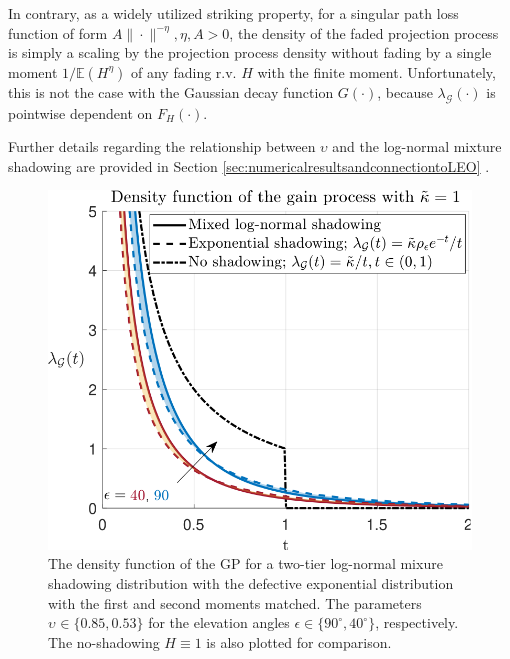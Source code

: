 \documentclass[lettersize,journal]{IEEEtran}
\begin{document}
In contrary, as a widely utilized striking property, for a singular path loss function of form $A\|\cdot\|^{-\eta}, \eta,A>0$, the density of the faded projection process is simply a scaling by the projection process density without fading by a single moment $1/\mathbb{E}(H^{\eta})$ of any fading r.v. $H$ with the finite moment. Unfortunately, this is not the case with the Gaussian decay function $G(\cdot)$, because $\lambda_{\mathcal{G}}(\cdot)$ is pointwise dependent on $F_{H}(\cdot)$.

 Further details regarding the relationship between $\upsilon$ and the log-normal mixture shadowing are provided in Section \ref{sec:numericalresultsandconnectiontoLEO} . 
         \begin{figure}[h]
           \centering
           \includegraphics[width=\linewidth]{plotdensities.pdf}
           \caption{The density function of the GP for a two-tier log-normal mixure shadowing distribution with the defective exponential distribution with the first and second moments matched. The parameters $\upsilon_{} \in \{0.85,0.53\}$ for the elevation angles $\epsilon \in \{90^{\circ},40^{\circ}\}$, respectively. The no-shadowing $H\equiv 1$ is also plotted for comparison.} 
           \label{fig:plotdensities}
         \end{figure}
\end{document}

